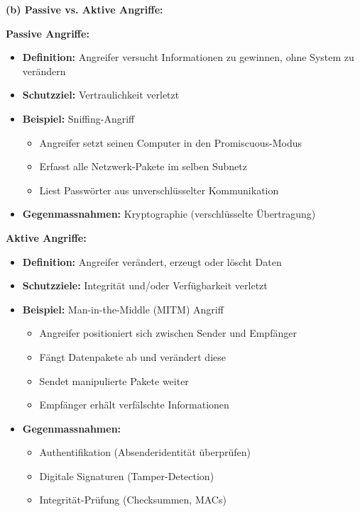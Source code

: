 \documentclass[12pt,a4paper]{article}
\begin{document}
\begin{tcolorbox}[colback=solutionbg, colframe=black!30]

\textbf{(b) Passive vs. Aktive Angriffe:} \checkmark

\textbf{Passive Angriffe:}
\begin{itemize}
    \item \textbf{Definition:} Angreifer versucht Informationen zu gewinnen, ohne System zu verändern
    \item \textbf{Schutzziel:} Vertraulichkeit verletzt
    \item \textbf{Beispiel:} Sniffing-Angriff
    \begin{itemize}
        \item Angreifer setzt seinen Computer in den Promiscuous-Modus
        \item Erfasst alle Netzwerk-Pakete im selben Subnetz
        \item Liest Passwörter aus unverschlüsselter Kommunikation
    \end{itemize}
    \item \textbf{Gegenmassnahmen:} Kryptographie (verschlüsselte Übertragung)
\end{itemize}

\textbf{Aktive Angriffe:}
\begin{itemize}
    \item \textbf{Definition:} Angreifer verändert, erzeugt oder löscht Daten
    \item \textbf{Schutzziele:} Integrität und/oder Verfügbarkeit verletzt
    \item \textbf{Beispiel:} Man-in-the-Middle (MITM) Angriff
    \begin{itemize}
        \item Angreifer positioniert sich zwischen Sender und Empfänger
        \item Fängt Datenpakete ab und verändert diese
        \item Sendet manipulierte Pakete weiter
        \item Empfänger erhält verfälschte Informationen
    \end{itemize}
    \item \textbf{Gegenmassnahmen:} 
    \begin{itemize}
        \item Authentifikation (Absenderidentität überprüfen)
        \item Digitale Signaturen (Tamper-Detection)
        \item Integrität-Prüfung (Checksummen, MACs)
    \end{itemize}
\end{itemize}

\end{tcolorbox}
\end{document}
